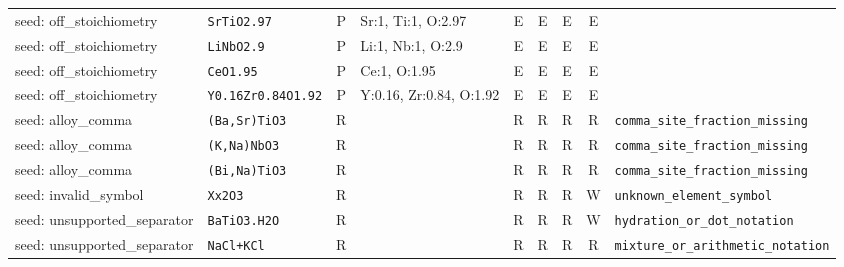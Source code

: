 \begin{longtable}{@{}>{\raggedright\arraybackslash}p{2.5cm}lcp{2.9cm}cccc>{\raggedright\arraybackslash}p{2.7cm}@{}}
seed: off\_stoichiometry & \texttt{SrTiO2.97} & P & Sr:1, Ti:1, O:2.97 & E & E & E & E & {\scriptsize\texttt{}} \\
seed: off\_stoichiometry & \texttt{LiNbO2.9} & P & Li:1, Nb:1, O:2.9 & E & E & E & E & {\scriptsize\texttt{}} \\
seed: off\_stoichiometry & \texttt{CeO1.95} & P & Ce:1, O:1.95 & E & E & E & E & {\scriptsize\texttt{}} \\
seed: off\_stoichiometry & \texttt{Y0.16Zr0.84O1.92} & P & Y:0.16, Zr:0.84, O:1.92 & E & E & E & E & {\scriptsize\texttt{}} \\
seed: alloy\_comma & \texttt{(Ba,Sr)TiO3} & R &  & R & R & R & R & {\scriptsize\texttt{comma\_\allowbreak{}site\_\allowbreak{}fraction\_\allowbreak{}missing}} \\
seed: alloy\_comma & \texttt{(K,Na)NbO3} & R &  & R & R & R & R & {\scriptsize\texttt{comma\_\allowbreak{}site\_\allowbreak{}fraction\_\allowbreak{}missing}} \\
seed: alloy\_comma & \texttt{(Bi,Na)TiO3} & R &  & R & R & R & R & {\scriptsize\texttt{comma\_\allowbreak{}site\_\allowbreak{}fraction\_\allowbreak{}missing}} \\
seed: invalid\_symbol & \texttt{Xx2O3} & R &  & R & R & R & W & {\scriptsize\texttt{unknown\_\allowbreak{}element\_\allowbreak{}symbol}} \\
seed: unsupported\_separator & \texttt{BaTiO3.H2O} & R &  & R & R & R & W & {\scriptsize\texttt{hydration\_\allowbreak{}or\_\allowbreak{}dot\_\allowbreak{}notation}} \\
seed: unsupported\_separator & \texttt{NaCl+KCl} & R &  & R & R & R & R & {\scriptsize\texttt{mixture\_\allowbreak{}or\_\allowbreak{}arithmetic\_\allowbreak{}notation}} \\
\bottomrule
\end{longtable}

